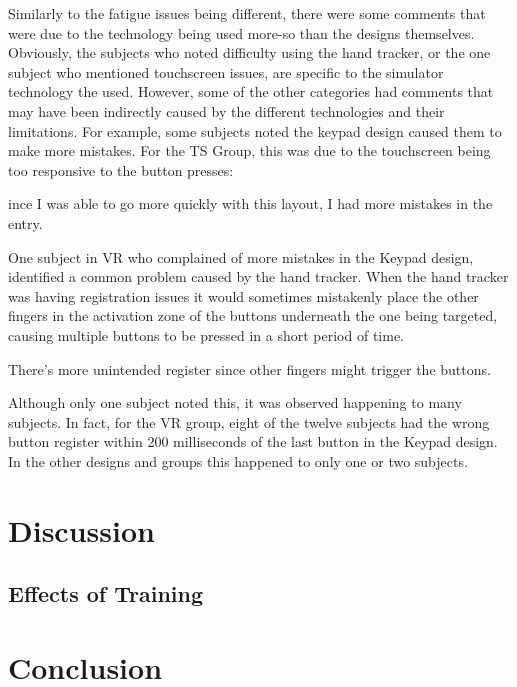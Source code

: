 Similarly to the fatigue issues being different, there were some comments that were due to the technology being used more-so than the designs themselves.
Obviously, the subjects who noted difficulty using the hand tracker, or the one subject who mentioned touchscreen issues, are specific to the simulator technology the used.
However, some of the other categories had comments that may have been indirectly caused by the different technologies and their limitations.
For example, some subjects noted the keypad design caused them to make more mistakes.
For the TS Group, this was due to the touchscreen being too responsive to the button presses:
\begin{displayquote}[TS Subject]
    ince I was able to go more quickly with this layout, I had more mistakes in the entry.
\end{displayquote}
One subject in VR who complained of more mistakes in the Keypad design, identified a common problem caused by the hand tracker.
When the hand tracker was having registration issues it would sometimes mistakenly place the other fingers in the activation zone of the buttons underneath the one being targeted, causing multiple buttons to be pressed in a short period of time.
\begin{displayquote}[VR Subject]
    There's more unintended register since other fingers might trigger the buttons.
\end{displayquote}
Although only one subject noted this, it was observed happening to many subjects.
In fact, for the VR group, eight of the twelve subjects had the wrong button register within 200 milliseconds of the last button in the Keypad design.
In the other designs and groups this happened to only one or two subjects.


\section{Discussion}


\subsection{Effects of Training}


\section{Conclusion}
